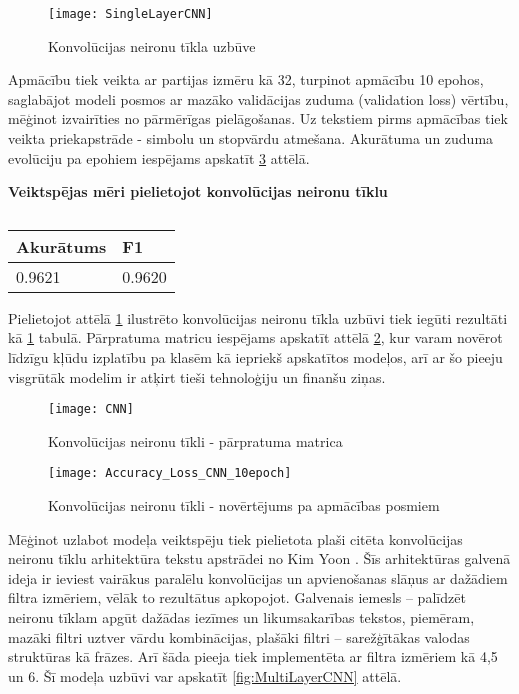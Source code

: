 \begin{figure}[H]
	\centering
	\texttt{[image: SingleLayerCNN]}
	\caption{Konvolūcijas neironu tīkla uzbūve}
	\label{fig:SingleLayerCNN}
\end{figure}

\pagebreak
Apmācību tiek veikta ar partijas izmēru kā 32, turpinot apmācību 10 epohos, saglabājot modeli posmos ar mazāko validācijas zuduma (validation loss) vērtību, mēģinot izvairīties no pārmērīgas pielāgošanas. Uz tekstiem pirms apmācības tiek veikta priekapstrāde - simbolu un stopvārdu atmešana. Akurātuma un zuduma evolūciju pa epohiem iespējams apskatīt \ref{fig:Accuracy_Loss_CNN_10epoch} attēlā.

\begin{table}[H]
\centering
\caption{\label{tab:score_cnn}}
\textbf{Veiktspējas mēri pielietojot konvolūcijas neironu tīklu\\}
\begin{tabular}{|l|l|}
\hline
Akurātums & F1 \\ \hline
0.9621 & 0.9620  \\ \hline
\end{tabular}
\end{table}

Pielietojot attēlā \ref{fig:SingleLayerCNN} ilustrēto konvolūcijas neironu tīkla uzbūvi tiek iegūti rezultāti kā \ref{tab:score_cnn} tabulā. Pārpratuma matricu iespējams apskatīt attēlā \ref{fig:CNN}, kur varam novērot līdzīgu kļūdu izplatību pa klasēm kā iepriekš apskatītos modeļos, arī ar šo pieeju visgrūtāk modelim ir atķirt tieši tehnoloģiju un finanšu ziņas.

\begin{figure}[H]
	\centering
	\texttt{[image: CNN]}
	\caption{Konvolūcijas neironu tīkli - pārpratuma matrica}
	\label{fig:CNN}
\end{figure}

\begin{figure}[H]
	\texttt{[image: Accuracy\_Loss\_CNN\_10epoch]}
	\caption{Konvolūcijas neironu tīkli - novērtējums pa apmācības posmiem}
	\label{fig:Accuracy_Loss_CNN_10epoch}
\end{figure}

Mēģinot uzlabot modeļa veiktspēju tiek pielietota plaši citēta konvolūcijas neironu tīklu arhitektūra tekstu apstrādei no Kim Yoon \cite{kimYoonCNN}. Šīs arhitektūras galvenā ideja ir ieviest vairākus paralēlu konvolūcijas un apvienošanas slāņus ar dažādiem filtra izmēriem, vēlāk to rezultātus apkopojot. Galvenais iemesls – palīdzēt neironu tīklam apgūt dažādas iezīmes un likumsakarības tekstos, piemēram, mazāki filtri uztver vārdu kombinācijas, plašāki filtri – sarežģītākas valodas struktūras kā frāzes. Arī šāda pieeja tiek implementēta ar filtra izmēriem kā 4,5 un 6. Šī modeļa uzbūvi var apskatīt \ref{fig:MultiLayerCNN} attēlā.

